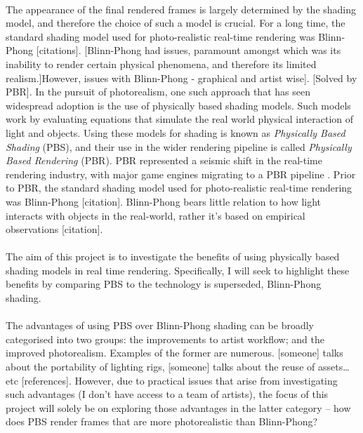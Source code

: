 \paragraph{}The appearance of the final rendered frames is largely determined by the shading model, and therefore the choice of such a model is crucial. For a long time, the standard shading model used for photo-realistic real-time rendering was Blinn-Phong [citations]. [Blinn-Phong had issues, paramount amongst which was its inability to render certain physical phenomena, and therefore its limited realism.]However, issues with Blinn-Phong - graphical and artist wise]. [Solved by PBR]. In the pursuit of photorealism, one such approach that has seen widespread adoption is the use of physically based shading models. Such models work by evaluating equations that simulate the real world physical interaction of light and objects. Using these models for shading is known as \textit{Physically Based Shading} (PBS), and their use in the wider rendering pipeline is called \textit{Physically Based Rendering} (PBR). PBR represented a seismic shift in the real-time rendering industry, with major game engines migrating to a PBR pipeline \cite{movingFrostbitetoPBR} \cite{RealShadingInUnreal}. Prior to PBR, the standard shading model used for photo-realistic real-time rendering was Blinn-Phong [citation]. Blinn-Phong bears little relation to how light interacts with objects in the real-world, rather it’s based on empirical observations [citation].

\paragraph{}The aim of this project is to investigate the benefits of using physically based shading models in real time rendering. Specifically, I will seek to highlight these benefits by comparing PBS to the technology is superseded, Blinn-Phong shading.

\paragraph{}The advantages of using PBS over Blinn-Phong shading can be broadly categorised into two groups: the improvements to artist workflow; and the improved photorealism. Examples of the former are numerous. [someone] talks about the portability of lighting rigs, [someone] talks about the reuse of assets… etc [references]. However, due to practical issues that arise from investigating such advantages (I don’t have access to a team of artists), the focus of this project will solely be on exploring those advantages in the latter category – how does PBS render frames that are more photorealistic than Blinn-Phong?

